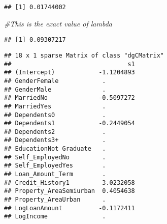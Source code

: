 \documentclass[
]{article}
\newenvironment{Shaded}{\begin{snugshade}}{\end{snugshade}}
\newcommand{\CommentTok}[1]{\textcolor[rgb]{0.56,0.35,0.01}{\textit{#1}}}
\newcommand{\FloatTok}[1]{\textcolor[rgb]{0.00,0.00,0.81}{#1}}
\newcommand{\FunctionTok}[1]{\textcolor[rgb]{0.00,0.00,0.00}{#1}}
\newcommand{\NormalTok}[1]{#1}
\newcommand{\SpecialCharTok}[1]{\textcolor[rgb]{0.00,0.00,0.00}{#1}}
\begin{document}
\begin{Shaded}
\end{Shaded}

\begin{verbatim}
## [1] 0.01744002
\end{verbatim}

\begin{Shaded}
\begin{Highlighting}[]
\CommentTok{\#This is the exact value of lambda}
\end{Highlighting}
\end{Shaded}

\begin{Shaded}
\end{Shaded}

\begin{verbatim}
## [1] 0.09307217
\end{verbatim}

\begin{Shaded}
\end{Shaded}

\begin{verbatim}
## 18 x 1 sparse Matrix of class "dgCMatrix"
##                                s1
## (Intercept)            -1.1204893
## GenderFemale            .        
## GenderMale              .        
## MarriedNo              -0.5097272
## MarriedYes              .        
## Dependents0             .        
## Dependents1            -0.2449054
## Dependents2             .        
## Dependents3+            .        
## EducationNot Graduate   .        
## Self_EmployedNo         .        
## Self_EmployedYes        .        
## Loan_Amount_Term        .        
## Credit_History1         3.0232058
## Property_AreaSemiurban  0.4054638
## Property_AreaUrban      .        
## LogLoanAmount          -0.1172411
## LogIncome               .
\end{verbatim}
\end{document}
